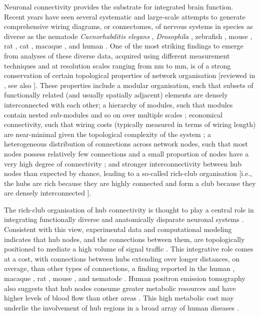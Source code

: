 Neuronal connectivity provides the substrate for integrated brain function.
Recent years have seen several systematic and large-scale attempts to generate comprehensive wiring diagrams, or connectomes, of nervous systems \citep{VandenHeuvel2016} in species as diverse as the nematode \emph{Caenorhabditis elegans} \citep{White1986, Varshney2011}, \emph{Drosophila} \citep{Chiang2011a, Shih2015}, zebrafish \citep{Wanner2016, Hildebrand2017}, mouse \citep{Oh2014, Zingg2014}, rat \citep{Bota2015}, cat \citep{Scannell1995}, macaque \citep{Markov2014, Stephan2001}, and human \citep{Hagmann2008, VanEssen2013}.
One of the most striking findings to emerge from analyses of these diverse data, acquired using different measurement techniques and at resolution scales ranging from nm to mm, is of a strong conservation of certain topological properties of network organisation [reviewed in \citep{Bullmore2009, Bullmore2012, Sporns2011, VandenHeuvel2016b, Schroter2017}, see also \citep{Fornito2016}].
These properties include a modular organisation, such that subsets of functionally related (and usually spatially adjacent) elements are densely interconnected with each other;
a hierarchy of modules, such that modules contain nested sub-modules and so on over multiple scales \citep{Meunier2010a, Bassett2010};
economical connectivity, such that wiring costs (typically measured in terms of wiring length) are near-minimal given the topological complexity of the system \citep{Betzel2016, Bassett2010};
a heterogeneous distribution of connections across network nodes, such that most nodes possess relatively few connections and a small proportion of nodes have a very high degree of connectivity \citep{VandenHeuvel2013b, Varshney2011};
and stronger interconnectivity between hub nodes than expected by chance, leading to a so-called rich-club organisation [i.e., the hubs are rich because they are highly connected and form a club because they are densely interconnected \citep{VandenHeuvel2011,Zamora-Lopez2010,DeReus2013b,Towlson2013,Shih2015}].

The rich-club organisation of hub connectivity is thought to play a central role in integrating functionally diverse and anatomically disparate neuronal systems \citep{Fornito2015,VandenHeuvel2013a,Zamora-Lopez2010, Crossley2014,Crossley2013}. Consistent with this view, experimental data and computational modeling indicates that hub nodes, and the connections between them, are topologically positioned to mediate a high volume of signal traffic \citep{VandenHeuvel2012, Harriger2012, Misic2014, Misic2015a}.
This integrative role comes at a cost, with connections between hubs extending over longer distances, on average, than other types of connections, a finding reported in the human \citep{VandenHeuvel2012}, macaque \citep{Harriger2012}, rat \citep{VandenHeuvel2016b}, mouse \citep{Fulcher2016}, and nematode \citep{Towlson2013}.
Human positron emission tomography also suggests that hub nodes consume greater metabolic resources and have higher levels of blood flow than other areas \citep{Tomasi2013, Collin2014, Liang2013a}.
This high metabolic cost may underlie the involvement of hub regions in a broad array of human diseases \citep{Fornito2015, Bullmore2012, Crossley2014}.

